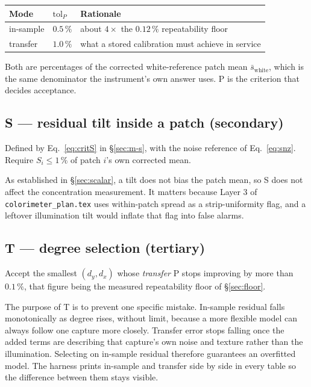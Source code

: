 \documentclass[11pt, a4paper]{article}
\newcommand{\code}[1]{\texttt{#1}}
\newcommand{\pct}{\,\%}
\begin{document}
\begin{center}
\begin{tabular}{lll}
\toprule
Mode & $\mathrm{tol}_P$ & Rationale \\
\midrule
in-sample & $0.5\pct$ & about $4\times$ the $0.12\pct$ repeatability floor \\
transfer  & $1.0\pct$ & what a stored calibration must achieve in service \\
\bottomrule
\end{tabular}
\end{center}

Both are percentages of the corrected white-reference patch mean
$\bar{s}_{\mathrm{white}}$,
which is the same denominator the instrument's own answer uses.
P is the criterion that decides acceptance.

\subsection{S --- residual tilt inside a patch (secondary)}

Defined by Eq.~\ref{eq:critS} in \S\ref{sec:m-s},
with the noise reference of Eq.~\ref{eq:snz}.
Require $S_i \le 1\pct$ of patch $i$'s own corrected mean.

As established in \S\ref{sec:scalar},
a tilt does not bias the patch mean,
so S does not affect the concentration measurement.
It matters because Layer 3 of \code{colorimeter\_plan.tex}
uses within-patch spread as a strip-uniformity flag,
and a leftover illumination tilt would inflate that flag
into false alarms.

\subsection{T --- degree selection (tertiary)}

Accept the smallest $(d_y,d_x)$ whose \emph{transfer} P
stops improving by more than $0.1\pct$,
that figure being the measured repeatability floor of \S\ref{sec:floor}.

The purpose of T is to prevent one specific mistake.
In-sample residual falls monotonically as degree rises, without limit,
because a more flexible model can always follow one capture more closely.
Transfer error stops falling once the added terms are describing
that capture's own noise and texture rather than the illumination.
Selecting on in-sample residual therefore guarantees an overfitted model.
The harness prints in-sample and transfer side by side in every table
so the difference between them stays visible.
\end{document}
